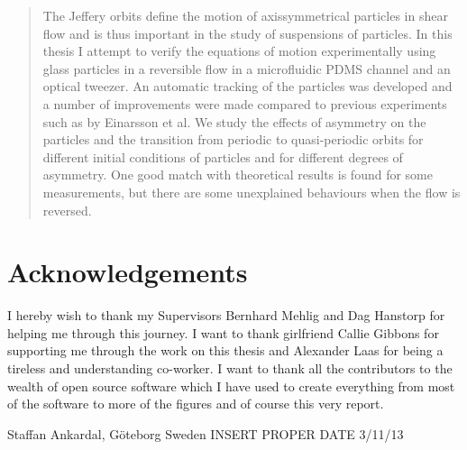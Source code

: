 \begin{abstract}
The Jeffery orbits define the motion of axissymmetrical particles in shear flow and is thus important in the study of suspensions of particles. In this thesis I attempt to verify the equations of motion experimentally using glass particles in a reversible flow in a microfluidic PDMS channel and an optical tweezer. An automatic tracking of the particles was developed and a number of improvements were made compared to previous experiments such as by Einarsson et al\cite{JonasExperiment}. We study the effects of asymmetry on the particles and the transition from periodic to quasi-periodic orbits for different initial conditions of particles and for different degrees of asymmetry. One good match with theoretical results is found for some measurements, but there are some unexplained behaviours when the  flow is reversed.
\end{abstract}

\newpage
\clearpage
\mbox{}
\thispagestyle{empty}
\section*{Acknowledgements}
I hereby wish to thank my Supervisors Bernhard Mehlig and Dag Hanstorp for helping me through this journey. I want to thank girlfriend Callie Gibbons for supporting me through the work on this thesis and Alexander Laas for being a tireless and understanding co-worker. I want to thank all the contributors to the wealth of open source software which I have used to create everything from most of the software to more of the figures and of course this very report. 

\hfill Staffan Ankardal, Göteborg Sweden INSERT PROPER DATE 3/11/13

